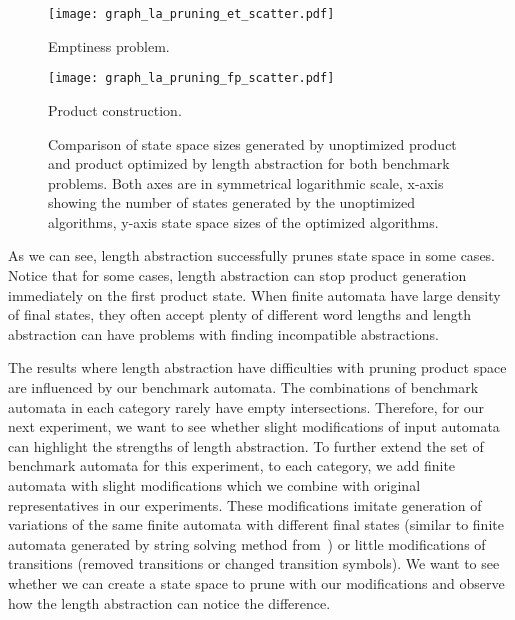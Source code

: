 \begin{figure*}[ht]
    \centering
    \begin{minipage}{0.49\linewidth}
        \centering
        \texttt{[image: graph\_la\_pruning\_et\_scatter.pdf]}
        \caption{Emptiness problem.}
        \label{fig:graph:et_pruning_state_space_sizes_comp}
    \end{minipage}
    \hfill
    \begin{minipage}{0.49\linewidth}
        \centering
        \texttt{[image: graph\_la\_pruning\_fp\_scatter.pdf]}
        \caption{Product construction.}
        \label{fig:graph:fp_pruning_state_space_sizes_comp}
    \end{minipage}
    \vspace{0.5cm}
    \caption{Comparison of state space sizes generated by unoptimized product and product optimized by length abstraction for both benchmark problems. Both axes are in symmetrical logarithmic scale\protect\footnotemark, x-axis showing the number of states generated by the unoptimized algorithms, y-axis state space sizes of the optimized algorithms.}
    \label{fig:graph:product_state_space_sizes}
\end{figure*}

As we can see, length abstraction successfully prunes state space in some cases. Notice that for some cases, length abstraction can stop product generation immediately on the first product state. When finite automata have large density of final states, they often accept plenty of different word lengths and length abstraction can have problems with finding incompatible abstractions.

The results where length abstraction have difficulties with pruning product space are influenced by our benchmark automata. The combinations of benchmark automata in each category rarely have empty intersections. Therefore, for our next experiment, we want to see whether slight modifications of input automata can highlight the strengths of length abstraction. To further extend the set of benchmark automata for this experiment, to each category, we add finite automata with slight modifications which we combine with original representatives in our experiments. These modifications imitate generation of variations of the same finite automata with different final states (similar to finite automata generated by string solving method from~\cite{10.1007/978-3-319-08867-9_10}) or little modifications of transitions (removed transitions or changed transition symbols). We want to see whether we can create a state space to prune with our modifications and observe how the length abstraction can notice the difference.

